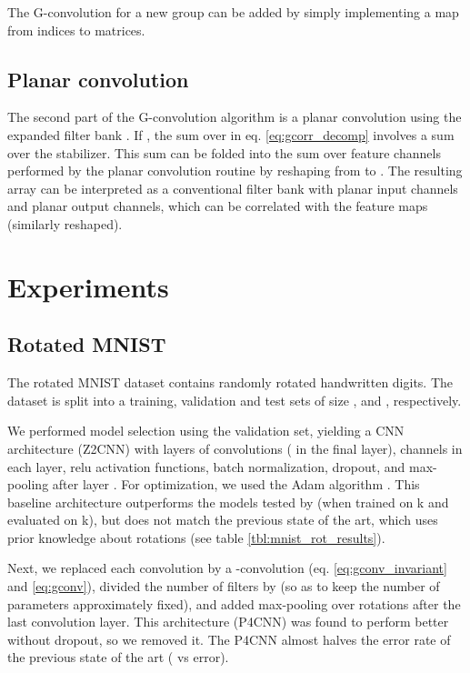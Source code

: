 \documentclass{article}
\begin{document}
The G-convolution for a new group can be added by simply implementing a map  from indices to matrices.

\subsection{Planar convolution}

The second part of the G-convolution algorithm is a planar convolution using the expanded filter bank .
If , the sum over  in eq. \ref{eq:gcorr_decomp} involves a sum over the stabilizer.
This sum can be folded into the sum over feature channels performed by the planar convolution routine by reshaping  from  to .
The resulting array can be interpreted as a conventional filter bank with  planar input channels and  planar output channels, which can be correlated with the feature maps  (similarly reshaped).

\section{Experiments}
\label{sec:experiments}

\subsection{Rotated MNIST}

The rotated MNIST dataset \cite{Larochelle2007} contains  randomly rotated handwritten digits.
The dataset is split into a training, validation and test sets of size ,  and , respectively.

We performed model selection using the validation set, yielding a CNN architecture (Z2CNN) with  layers of  convolutions ( in the final layer),  channels in each layer, relu activation functions, batch normalization, dropout, and max-pooling after layer .
For optimization, we used the Adam algorithm \cite{Kingma2015}.
This baseline architecture outperforms the models tested by \citet{Larochelle2007} (when trained on k and evaluated on k), but does not match the previous state of the art, which uses prior knowledge about rotations \cite{Schmidt2012} (see table \ref{tbl:mnist_rot_results}).

Next, we replaced each convolution by a -convolution (eq. \ref{eq:gconv_invariant} and \ref{eq:gconv}), divided the number of filters by  (so as to keep the number of parameters approximately fixed), and added max-pooling over rotations after the last convolution layer.
This architecture (P4CNN) was found to perform better without dropout, so we removed it.
The P4CNN almost halves the error rate of the previous state of the art ( vs  error).
\end{document}
